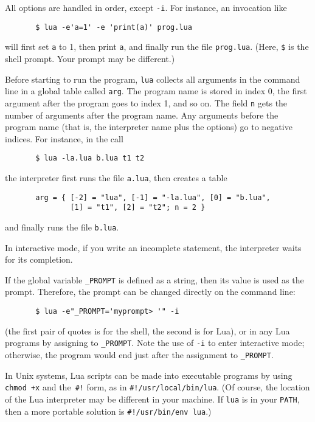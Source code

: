 \documentclass[11pt,twoside,draft]{article}
\makeatletter
\newcommand{\T}[1]{{\tt #1}}
\newcommand{\IndexVerb}[1]{\T{#1}\index{#1@{\tt #1}}}
\makeatother
\begin{document}
All options are handled in order, except \verb|-i|.
For instance, an invocation like
\begin{verbatim}
       $ lua -e'a=1' -e 'print(a)' prog.lua
\end{verbatim}
will first set \verb|a| to 1, then print \verb|a|,
and finally run the file \verb|prog.lua|.
(Here, \verb|$| is the shell prompt. Your prompt may be different.)

Before starting to run the program,
\verb|lua| collects all arguments in the command line
in a global table called \verb|arg|.
The program name is stored in index 0,
the first argument after the program goes to index 1,
and so on.
The field \verb|n| gets the number of arguments after the program name.
Any arguments before the program name
(that is, the interpreter name plus the options)
go to negative indices.
For instance, in the call
\begin{verbatim}
       $ lua -la.lua b.lua t1 t2
\end{verbatim}
the interpreter first runs the file \T{a.lua},
then creates a table
\begin{verbatim}
       arg = { [-2] = "lua", [-1] = "-la.lua", [0] = "b.lua",
               [1] = "t1", [2] = "t2"; n = 2 }
\end{verbatim}
and finally runs the file \T{b.lua}.

In interactive mode,
if you write an incomplete statement,
the interpreter waits for its completion.

If the global variable \IndexVerb{_PROMPT} is defined as a string,
then its value is used as the prompt.
Therefore, the prompt can be changed directly on the command line:
\begin{verbatim}
       $ lua -e"_PROMPT='myprompt> '" -i
\end{verbatim}
(the first pair of quotes is for the shell,
the second is for Lua),
or in any Lua programs by assigning to \verb|_PROMPT|.
Note the use of \verb|-i| to enter interactive mode; otherwise,
the program would end just after the assignment to \verb|_PROMPT|.

In Unix systems, Lua scripts can be made into executable programs
by using \verb|chmod +x| and the~\verb|#!| form,
as in \verb|#!/usr/local/bin/lua|.
(Of course,
the location of the Lua interpreter may be different in your machine.
If \verb|lua| is in your \verb|PATH|,
then a more portable solution is \verb|#!/usr/bin/env lua|.)


\end{document}
